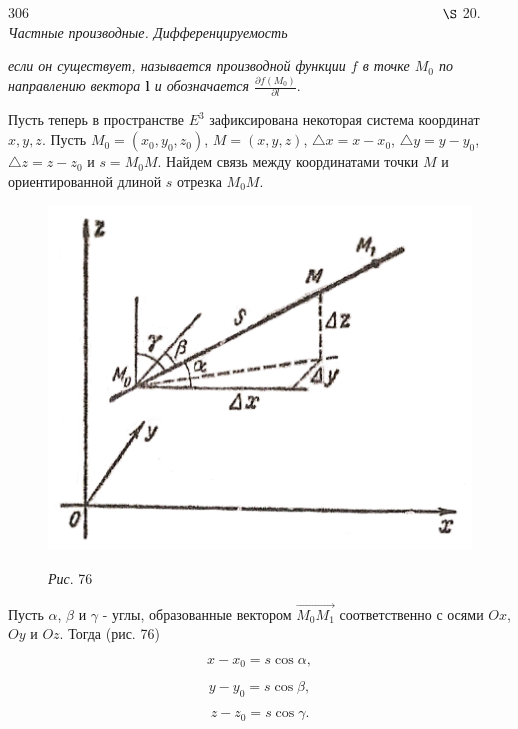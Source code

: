 \documentclass[a4paper,12pt]{book}
\begin{document}
\fontsize{14pt}{14pt}\selectfont
\parindent=0.0cm
{\small 306\ \ \ \ \ \ \ \ \ \ \ \ \ \ \ \ \ \ \ \ \ \ \ \ \ \ \ \ \ \ \ \ \ \ \ \ \ \ \ \ \ \ \ \ \ \ \ \ \ \ \ \ \ \ \ \ \ \ \ $\S$ 20. \textit{Частные производные. Дифференцируемость}
}\par
\vspace{1.5em}
\parindent=0.0cm
\textit{если он существует, называется производной функции $f$ в точке $M_0$ по направлению вектора $\textbf{l}$ и обозначается $\frac{\partial f(M_0)}{\partial l}$}.\par
\parindent=0.7cm
Пусть теперь в пространстве $E^3$ зафиксирована некоторая система координат $x, y, z$. Пусть $M_0 = (x_0, y_0, z_0)$, $M = (x, y, z)$, $\bigtriangleup x = x - x_0$, $\bigtriangleup y = y - y_0$, $\bigtriangleup z = z - z_0$ и $s = M_0M$. Найдем связь между координатами точки $M$ и ориентированной длиной $s$ отрезка $M_0M$.\par
\begin{figure}
\vspace{-10pt}
\includegraphics[scale=1.5]{grafik.png}
\begin{center}
\textit{Рис}. 76
\end{center}
\end{figure}\par
\parindent=0.0cm
Пусть $\alpha$, $\beta$ и $\gamma$ - углы, образованные вектором $\overrightarrow{M_0M_1}$ соответственно с осями $Ox$, $Oy$ и $Oz$. Тогда (рис. 76)\par
$$
x - x_0 = s\cos \alpha,
$$\par
$$
y - y_0 = s\cos \beta,
$$\par
$$
z - z_0 = s\cos \gamma.
$$\par	
\end{document}
